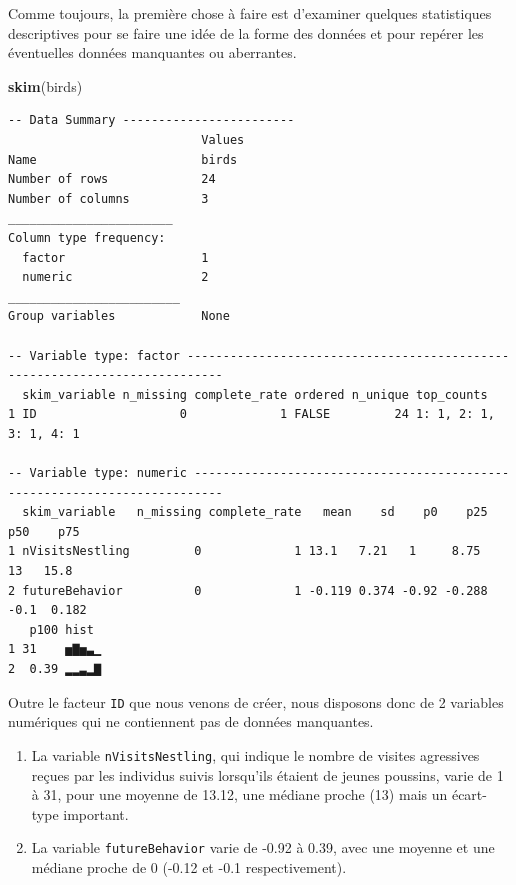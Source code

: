 \documentclass[a4paperpaper,]{article}
\newenvironment{Shaded}{\begin{snugshade}}{\end{snugshade}}
\newcommand{\KeywordTok}[1]{\textcolor[rgb]{0.12,0.11,0.11}{\textbf{#1}}}
\newcommand{\NormalTok}[1]{\textcolor[rgb]{0.12,0.11,0.11}{#1}}
\providecommand{\tightlist}{%
  \setlength{\itemsep}{0pt}\setlength{\parskip}{0pt}}
\begin{document}
Comme toujours, la première chose à faire est d'examiner quelques statistiques descriptives pour se faire une idée de la forme des données et pour repérer les éventuelles données manquantes ou aberrantes.

\begin{Shaded}
\begin{Highlighting}[]
\KeywordTok{skim}\NormalTok{(birds)}
\end{Highlighting}
\end{Shaded}

\begin{verbatim}
-- Data Summary ------------------------
                           Values
Name                       birds 
Number of rows             24    
Number of columns          3     
_______________________          
Column type frequency:           
  factor                   1     
  numeric                  2     
________________________         
Group variables            None  

-- Variable type: factor ---------------------------------------------------------------------------
  skim_variable n_missing complete_rate ordered n_unique top_counts            
1 ID                    0             1 FALSE         24 1: 1, 2: 1, 3: 1, 4: 1

-- Variable type: numeric --------------------------------------------------------------------------
  skim_variable   n_missing complete_rate   mean    sd    p0    p25   p50    p75
1 nVisitsNestling         0             1 13.1   7.21   1     8.75   13   15.8  
2 futureBehavior          0             1 -0.119 0.374 -0.92 -0.288  -0.1  0.182
   p100 hist 
1 31    ▅▇▅▃▁
2  0.39 ▂▂▃▂▇
\end{verbatim}

Outre le facteur \texttt{ID} que nous venons de créer, nous disposons donc de 2 variables numériques qui ne contiennent pas de données manquantes.

\begin{enumerate}
\def\labelenumi{\arabic{enumi}.}
\tightlist
\item
  La variable \texttt{nVisitsNestling}, qui indique le nombre de visites agressives reçues par les individus suivis lorsqu'ils étaient de jeunes poussins, varie de 1 à 31, pour une moyenne de 13.12, une médiane proche (13) mais un écart-type important.
\item
  La variable \texttt{futureBehavior} varie de -0.92 à 0.39, avec une moyenne et une médiane proche de 0 (-0.12 et -0.1 respectivement).
\end{enumerate}
\end{document}
